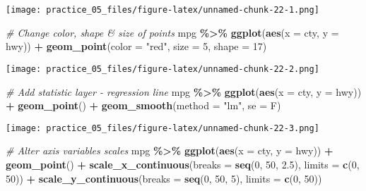\documentclass[
]{article}
\newenvironment{Shaded}{\begin{snugshade}}{\end{snugshade}}
\newcommand{\AttributeTok}[1]{\textcolor[rgb]{0.13,0.29,0.53}{#1}}
\newcommand{\CommentTok}[1]{\textcolor[rgb]{0.56,0.35,0.01}{\textit{#1}}}
\newcommand{\DecValTok}[1]{\textcolor[rgb]{0.00,0.00,0.81}{#1}}
\newcommand{\FloatTok}[1]{\textcolor[rgb]{0.00,0.00,0.81}{#1}}
\newcommand{\FunctionTok}[1]{\textcolor[rgb]{0.13,0.29,0.53}{\textbf{#1}}}
\newcommand{\NormalTok}[1]{#1}
\newcommand{\SpecialCharTok}[1]{\textcolor[rgb]{0.81,0.36,0.00}{\textbf{#1}}}
\newcommand{\StringTok}[1]{\textcolor[rgb]{0.31,0.60,0.02}{#1}}
\begin{document}
\texttt{[image: practice\_05\_files/figure-latex/unnamed-chunk-22-1.png]}

\begin{Shaded}
\begin{Highlighting}[]
\CommentTok{\# Change color, shape \& size of points}
\NormalTok{mpg }\SpecialCharTok{\%\textgreater{}\%} 
  \FunctionTok{ggplot}\NormalTok{(}\FunctionTok{aes}\NormalTok{(}\AttributeTok{x =}\NormalTok{ cty,}
             \AttributeTok{y =}\NormalTok{ hwy)) }\SpecialCharTok{+}
  \FunctionTok{geom\_point}\NormalTok{(}\AttributeTok{color =} \StringTok{"red"}\NormalTok{,}
             \AttributeTok{size =} \DecValTok{5}\NormalTok{,}
             \AttributeTok{shape =} \DecValTok{17}\NormalTok{)}
\end{Highlighting}
\end{Shaded}

\texttt{[image: practice\_05\_files/figure-latex/unnamed-chunk-22-2.png]}

\begin{Shaded}
\begin{Highlighting}[]
\CommentTok{\# Add statistic layer {-} regression line}
\NormalTok{mpg }\SpecialCharTok{\%\textgreater{}\%} 
  \FunctionTok{ggplot}\NormalTok{(}\FunctionTok{aes}\NormalTok{(}\AttributeTok{x =}\NormalTok{ cty,}
             \AttributeTok{y =}\NormalTok{ hwy)) }\SpecialCharTok{+}
  \FunctionTok{geom\_point}\NormalTok{() }\SpecialCharTok{+}
  \FunctionTok{geom\_smooth}\NormalTok{(}\AttributeTok{method =} \StringTok{"lm"}\NormalTok{, }
              \AttributeTok{se =}\NormalTok{ F)}
\end{Highlighting}
\end{Shaded}

\texttt{[image: practice\_05\_files/figure-latex/unnamed-chunk-22-3.png]}

\begin{Shaded}
\begin{Highlighting}[]
\CommentTok{\# Alter axis variables scales}
\NormalTok{mpg }\SpecialCharTok{\%\textgreater{}\%} 
  \FunctionTok{ggplot}\NormalTok{(}\FunctionTok{aes}\NormalTok{(}\AttributeTok{x =}\NormalTok{ cty,}
             \AttributeTok{y =}\NormalTok{ hwy)) }\SpecialCharTok{+}
  \FunctionTok{geom\_point}\NormalTok{() }\SpecialCharTok{+}
  \FunctionTok{scale\_x\_continuous}\NormalTok{(}\AttributeTok{breaks =} \FunctionTok{seq}\NormalTok{(}\DecValTok{0}\NormalTok{, }\DecValTok{50}\NormalTok{, }\FloatTok{2.5}\NormalTok{), }
                     \AttributeTok{limits =} \FunctionTok{c}\NormalTok{(}\DecValTok{0}\NormalTok{, }\DecValTok{50}\NormalTok{)) }\SpecialCharTok{+}
  \FunctionTok{scale\_y\_continuous}\NormalTok{(}\AttributeTok{breaks =} \FunctionTok{seq}\NormalTok{(}\DecValTok{0}\NormalTok{, }\DecValTok{50}\NormalTok{, }\DecValTok{5}\NormalTok{), }
                     \AttributeTok{limits =} \FunctionTok{c}\NormalTok{(}\DecValTok{0}\NormalTok{, }\DecValTok{50}\NormalTok{))}
\end{Highlighting}
\end{Shaded}
\end{document}
